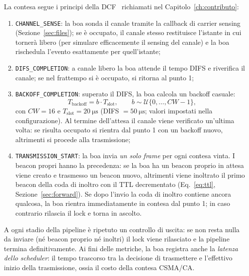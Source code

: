 La contesa segue i principi della DCF~\cite{sharetechnote-dcf,csma-ca} richiamati nel Capitolo~\ref{ch:contributo}:
\begin{enumerate}[leftmargin=1.6em,nosep]
  \item \texttt{CHANNEL\_SENSE}: la boa sonda il canale tramite la callback
  di carrier sensing (Sezione~\ref{sec:files}); se \`e occupato, il canale stesso restituisce l'istante in
  cui torner\`a libero (per simulare efficacemente il sensing del canale) e la boa rischedula l'evento esattamente per quell'istante;
  \item \texttt{DIFS\_COMPLETION}: a canale libero la boa attende il tempo DIFS e
  riverifica il canale; se nel frattempo si \`e occupato, si ritorna al punto 1;
  \item \texttt{BACKOFF\_COMPLETION}: superato il DIFS, la boa calcola un backoff casuale:
  \begin{equation}
    T_{\text{backoff}} = b \cdot T_{\text{slot}},
    \qquad b \sim \mathcal{U}\{0, \dots, CW-1\},
    \label{eq:backoff}
  \end{equation}
  con $CW = 16$ e $T_{\text{slot}} = \SI{20}{\micro\second}$
  (DIFS $= \SI{50}{\micro\second}$; valori impostati nella
  configurazione). Al termine dell'attesa il canale viene verificato un'ultima volta:
  se risulta occupato si rientra dal punto 1 con un backoff nuovo, altrimenti si
  procede alla trasmissione;
  \item \texttt{TRANSMISSION\_START}: la boa invia \emph{un solo frame} per ogni contesa
  vinta. I beacon propri hanno la precedenza: se la boa ha un beacon proprio in attesa viene
  creato e trasmesso un beacon nuovo, altrimenti viene inoltrato il primo beacon della
  coda di inoltro con il TTL decrementato (Eq.~\ref{eq:ttl},
  Sezione~\ref{sec:forward}). Se dopo l'invio la coda di
  inoltro contiene ancora qualcosa, la boa rientra immediatamente in contesa dal punto 1; in caso
  contrario rilascia il lock e torna in ascolto.
\end{enumerate}
A ogni stadio della pipeline \`e ripetuto un controllo di uscita: se non resta nulla da
inviare (n\'e beacon proprio n\'e inoltri) il lock viene rilasciato e la pipeline termina definitivamente. 
Ai fini delle metriche, la boa registra anche la \emph{latenza dello scheduler}:
il tempo trascorso tra la decisione di trasmettere e l'effettivo inizio della
trasmissione, ossia il costo della contesa CSMA/CA.

